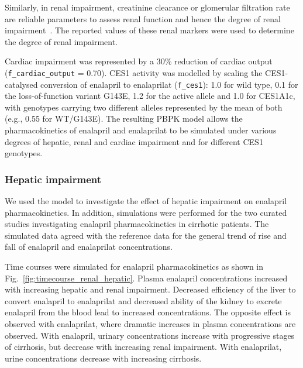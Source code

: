 \documentclass[pharmaceutics,article,submit,pdftex,moreauthors]{Definitions/mdpi}
\begin{document}
Similarly, in renal impairment, creatinine clearance or glomerular filtration rate are reliable parameters to assess renal function and hence the degree of renal impairment~\cite{Hockings1986}. The reported values of these renal markers were used to determine the degree of renal impairment.

Cardiac impairment was represented by a 30\% reduction of cardiac output (\texttt{f\_\allowbreak cardiac\_\allowbreak output} = 0.70). CES1 activity was modelled by scaling the CES1-catalysed conversion of enalapril to enalaprilat (\texttt{f\_ces1}): 1.0 for wild type, 0.1 for the loss-of-function variant G143E, 1.2 for the active allele and 1.0 for CES1A1c, with genotypes carrying two different alleles represented by the mean of both (e.g., 0.55 for WT/G143E). The resulting PBPK model allows the pharmacokinetics of enalapril and enalaprilat to be simulated under various degrees of hepatic, renal and cardiac impairment and for different CES1 genotypes.

\subsubsection{Hepatic impairment}
\label{sec:results_hepatic_scans}

We used the model to investigate the effect of hepatic impairment on enalapril pharmacokinetics. In addition, simulations were performed for the two curated studies investigating enalapril pharmacokinetics in cirrhotic patients. The simulated data agreed with the reference data for the general trend of rise and fall of enalapril and enalaprilat concentrations.


Time courses were simulated for enalapril pharmacokinetics as shown in Fig.~\ref{fig:timecourse_renal_hepatic}. Plasma enalapril concentrations increased with increasing hepatic and renal impairment. Decreased efficiency of the liver to convert enalapril to enalaprilat and decreased ability of the kidney to excrete enalapril from the blood lead to increased concentrations. The opposite effect is observed with enalaprilat, where dramatic increases in plasma concentrations are observed. With enalapril, urinary concentrations increase with progressive stages of cirrhosis, but decrease with increasing renal impairment. With enalaprilat, urine concentrations decrease with increasing cirrhosis.    
\end{document}
